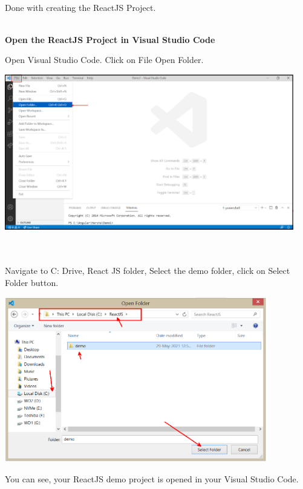 \documentclass{article}
\begin{document}
\noindent \\
Done with creating the ReactJS Project.

\noindent \\
\newpage
\textbf{Open the ReactJS Project in Visual Studio Code}

 
Open Visual Studio Code. Click on File  Open Folder.
 

\begin{center}
	\noindent \includegraphics*[width=4.97in, height=2.67in]{IMG-06-37}
\end{center}

\noindent \\
\\
Navigate to C: Drive, React JS folder, Select the demo folder, click on Select Folder button.
 

\begin{center}
	\noindent \includegraphics*[width=4.52in, height=2.83in]{IMG-06-38}
\end{center}
\newpage
\noindent You can see, your ReactJS demo project is opened in your Visual Studio Code.
 
\end{document}
